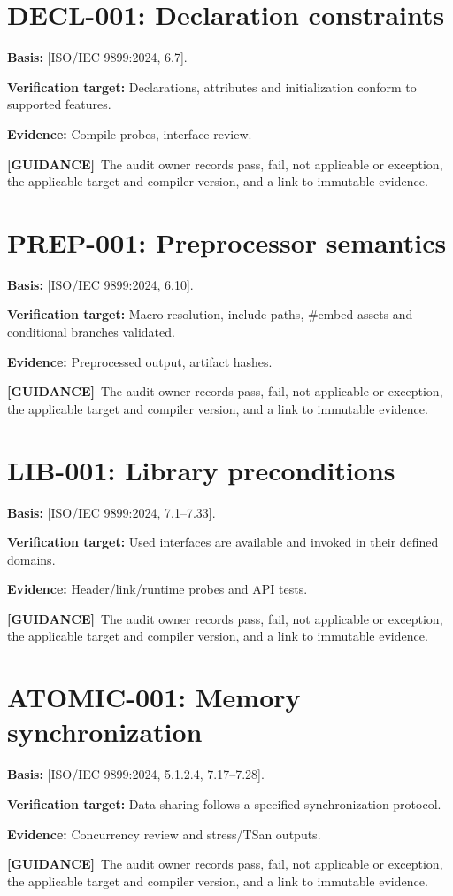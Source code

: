 \documentclass[10pt,letterpaper,oneside]{report}
\newcommand{\refcl}[1]{\textsf{\footnotesize[ISO/IEC 9899:2024, #1]}}
\newcommand{\guidance}{\textbf{[GUIDANCE]}}
\begin{document}
\section{DECL-001: Declaration constraints}
\textbf{Basis:} \refcl{6.7}.\par\textbf{Verification target:} Declarations, attributes and initialization conform to supported features.\par\textbf{Evidence:} Compile probes, interface review.\par\guidance\ The audit owner records pass, fail, not applicable or exception, the applicable target and compiler version, and a link to immutable evidence.
\section{PREP-001: Preprocessor semantics}
\textbf{Basis:} \refcl{6.10}.\par\textbf{Verification target:} Macro resolution, include paths, \#embed assets and conditional branches validated.\par\textbf{Evidence:} Preprocessed output, artifact hashes.\par\guidance\ The audit owner records pass, fail, not applicable or exception, the applicable target and compiler version, and a link to immutable evidence.
\section{LIB-001: Library preconditions}
\textbf{Basis:} \refcl{7.1--7.33}.\par\textbf{Verification target:} Used interfaces are available and invoked in their defined domains.\par\textbf{Evidence:} Header/link/runtime probes and API tests.\par\guidance\ The audit owner records pass, fail, not applicable or exception, the applicable target and compiler version, and a link to immutable evidence.
\section{ATOMIC-001: Memory synchronization}
\textbf{Basis:} \refcl{5.1.2.4, 7.17--7.28}.\par\textbf{Verification target:} Data sharing follows a specified synchronization protocol.\par\textbf{Evidence:} Concurrency review and stress/TSan outputs.\par\guidance\ The audit owner records pass, fail, not applicable or exception, the applicable target and compiler version, and a link to immutable evidence.
\end{document}
